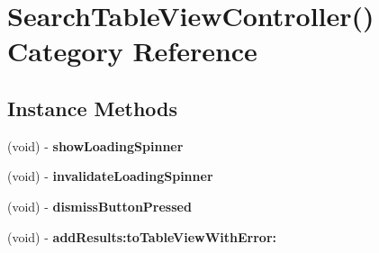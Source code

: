 \hypertarget{category_search_table_view_controller_07_08}{}\section{Search\+Table\+View\+Controller() Category Reference}
\label{category_search_table_view_controller_07_08}
\subsection*{Instance Methods}
\begin{DoxyCompactItemize}
\item 
(void) -\/ {\bfseries show\+Loading\+Spinner}\hypertarget{category_search_table_view_controller_07_08_aa9913c86c40d21519746f4f09c83ce5b}{}\label{category_search_table_view_controller_07_08_aa9913c86c40d21519746f4f09c83ce5b}

\item 
(void) -\/ {\bfseries invalidate\+Loading\+Spinner}\hypertarget{category_search_table_view_controller_07_08_a53e788d275da4df108f466d62367b1e9}{}\label{category_search_table_view_controller_07_08_a53e788d275da4df108f466d62367b1e9}

\item 
(void) -\/ {\bfseries dismiss\+Button\+Pressed}\hypertarget{category_search_table_view_controller_07_08_aabb072d0eb1e68905d6f087e818ec208}{}\label{category_search_table_view_controller_07_08_aabb072d0eb1e68905d6f087e818ec208}

\item 
(void) -\/ {\bfseries add\+Results\+:to\+Table\+View\+With\+Error\+:}\hypertarget{category_search_table_view_controller_07_08_ad66e6bb508ee8d33a7960ac0e87ec1e7}{}\label{category_search_table_view_controller_07_08_ad66e6bb508ee8d33a7960ac0e87ec1e7}

\end{DoxyCompactItemize}
